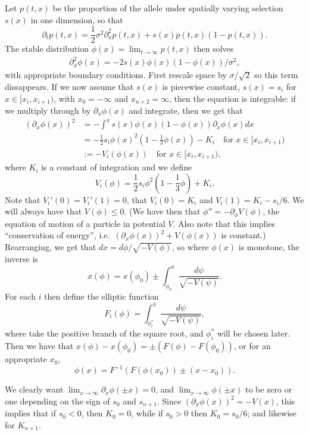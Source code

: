\documentclass{article}
\begin{document}
Let $p(t,x)$ be the proportion of the allele under spatially varying selection $s(x)$ in one dimension,
so that 
\[
\partial_t p(t,x) = \frac{1}{2} \sigma^2 \partial_x^2 p(t,x) + s(x) p(t,x) (1-p(t,x)) .
\]
The stable distribution $\phi(x) = \lim_{t\to\infty} p(t,x)$ then solves
\begin{align} \label{eqn:definingphi}
    \partial_x^2 \phi(x) = - 2 s(x) \phi(x) (1-\phi(x)) /\sigma^2,
\end{align}
with appropriate boundary conditions.
First rescale space by $\sigma/\sqrt{2}$ so this term dissappears.
If we now assume that $s(x)$ is piecewise constant,
$s(x) = s_i$ for $x \in [x_i,x_{i+1})$, with $x_0=-\infty$ and $x_{n+2}=\infty$,
then the equation is integrable: if we multiply through by $\partial_x \phi(x)$ and integrate, then we get that
\begin{align} \label{eqn:conservation}
    ( \partial_x \phi(x) )^2  &= - \int^{x} s(x) \phi(x) (1-\phi(x)) \partial_x \phi(x) dx \\
        &= - \frac{1}{2} s_i \phi(x)^2 \left( 1 - \frac{1}{3} \phi(x) \right) - K_i \quad \mbox{for } x \in [x_i,x_{i+1}) \\
        &:= - V_i(\phi(x)) \quad \mbox{for } x \in [x_i,x_{i+1}) ,
\end{align}
where $K_i$ is a constant of integration and we define
\[
        V_i(\phi) = \frac{1}{2} s_i \phi^2 \left( 1 - \frac{1}{3} \phi \right) + K_i .
\]
Note that $V_i'(0)=V_i'(1)=0$, that $V_i(0)=K_i$ and $V_i(1) = K_i-s_i/6$.  
We will always have that $V(\phi) \le 0$.
(We have then that $\phi'' = - \partial_\phi V(\phi)$, the equation of motion of a particle in potential $V$.
Also note that this implies ``conservation of energy'', i.e.\ $( \partial_x \phi(x) )^2 + V(\phi(x))$ is constant.)
Rearranging, we get that $dx = d\phi / \sqrt{-V(\phi)}$, so where $\phi(x)$ is monotone, the inverse is
\[
    x(\phi) = x(\phi_0) \pm \int_{\phi_0}^\phi \frac{ d\psi }{ \sqrt{ -V(\psi) } } .
\]
For each $i$ then define the elliptic function
\[
    F_i(\phi) = \int_{\phi_i^*}^\phi \frac{ d\psi }{ \sqrt{ -V(\psi) } } ,
\]
where take the positive branch of the square root, and $\phi_i^*$ will be chosen later.
Then we have that
$x(\phi) - x(\phi_0) = \pm( F(\phi) - F(\phi_0))$,
or for an appropriate $x_0$,
\[
    \phi(x) = F^{-1}\left( F(\phi(x_0)) \pm (x - x_0) \right).
\]

We clearly want $\lim_{x \to \infty} \partial_x \phi(\pm x) = 0$, 
and $\lim_{x \to \infty} \phi(\pm x)$ to be zero or one depending on the sign of $s_0$ and $s_{n+1}$.
Since $(\partial_x \phi(x))^2 = -V(x)$, this implies that if $s_0<0$, then $K_0 = 0$,
while if $s_0>0$ then $K_0 = s_0/6$; and likewise for $K_{n+1}$.
\end{document}
